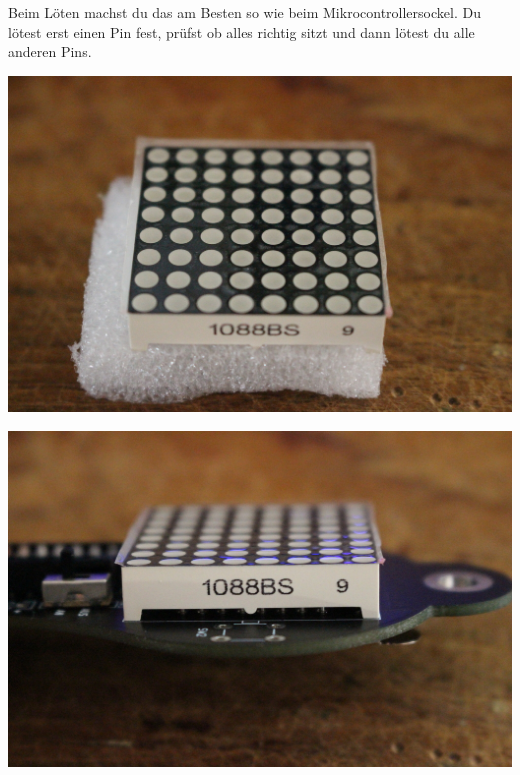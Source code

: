 \documentclass{article}
\begin{document}
Beim Löten machst du das am Besten so wie beim Mikrocontrollersockel. Du lötest erst einen Pin fest, prüfst ob alles richtig sitzt und dann lötest du alle anderen Pins.

\vspace{1cm}

\begin{minipage}[b]{0.5\textwidth}
	\includegraphics[width=\textwidth]{Bilder2022/IMG_8225.JPG}
\end{minipage}
\begin{minipage}[b]{0.5\textwidth}
	\includegraphics[width=\textwidth]{Bilder2022/IMG_8226.JPG}
\end{minipage}

\vspace{0.5cm}
\end{document}
